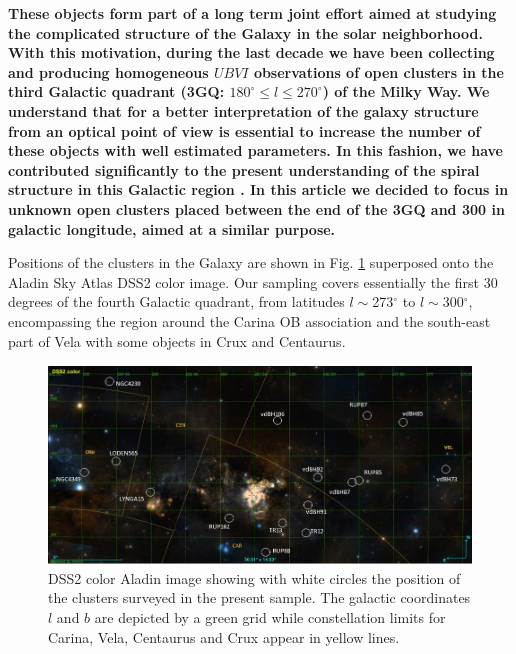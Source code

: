 \documentclass[referee]{aa}
\begin{document}
\textbf{
These objects form part of a long term joint effort aimed at studying the
complicated structure of the Galaxy in the solar neighborhood. With this
motivation, during the last decade we have been collecting and producing
homogeneous $UBVI$ observations of open clusters in the third Galactic quadrant
(3GQ: $180^\circ\leq l \leq270^\circ$) of the Milky Way. We understand that for
a better interpretation of the galaxy structure from an optical point of view
is essential to increase the number of these  objects with well estimated
parameters. In this fashion, we have contributed significantly to the present
understanding of the spiral structure in this Galactic region
\citep{Carraro_2005,Moitinho_2006,Vazquez2008,Carraro_2010}.
In this article we decided to focus in unknown open clusters placed
between the end of the 3GQ and 300 in galactic longitude, aimed at a similar
purpose.}

Positions of the clusters in the Galaxy are shown in Fig. \ref{fig1} superposed
onto the Aladin Sky Atlas DSS2 color image. Our sampling covers essentially the
first 30 degrees of the fourth Galactic quadrant, from latitudes
$l\sim$273$^\circ$ to $l\sim$300$^\circ$, encompassing the region around the
Carina OB association and the south-east part of Vela with some objects in Crux
and Centaurus.


\begin{figure}[ht]
    \centering
    \includegraphics[width=\hsize]{../figs/DSS2color.png}
    \caption{DSS2 color Aladin image showing with white circles the position of
    the clusters surveyed in the present sample. The galactic coordinates $l$
    and $b$ are depicted by a green grid while constellation limits for Carina,
    Vela, Centaurus and Crux appear in yellow lines.}
    \label{fig1}
\end{figure}




\end{document}
